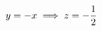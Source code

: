 \documentclass[preview]{standalone}
\begin{document}
\begin{align*}
\special{dvisvgm:raw <g id='unique000'>}y = -x \implies z = -\frac{1}{2}\special{dvisvgm:raw </g>}
\end{align*}
\end{document}
